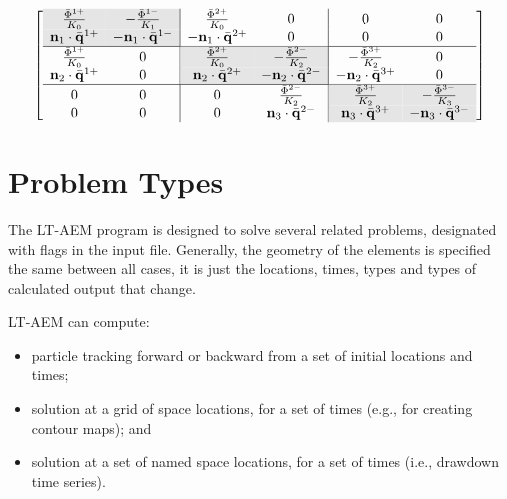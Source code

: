 \documentclass[12pt,letterpaper]{article}
\begin{document}
   \begin{equation}
  \label{eq:fullmatrix}
  \left[ \begin{array}{cc|cc|cc}
      \cellcolor[gray]{0.9}\frac{\bar{\Phi}^{1+}}{K_0} & 
      \cellcolor[gray]{0.9}-\frac{\bar{\Phi}^{1-}}{K_1}  
      & \frac{\bar{\Phi}^{2+}}{K_0}  &0&0&0\\
      \cellcolor[gray]{0.9} \mathbf{n}_1 \cdot \bar{\mathbf{q}}^{1+} & 
      \cellcolor[gray]{0.9} -\mathbf{n}_1 \cdot \bar{\mathbf{q}}^{1-} 
      & - \mathbf{n}_1 \cdot \bar{\mathbf{q}}^{2+} &0&0&0\\
      \hline
      \frac{\bar{\Phi}^{1+}}{K_0}  &0& \cellcolor[gray]{0.9} \frac{\bar{\Phi}^{2+}}{K_0} 
      & \cellcolor[gray]{0.9}-\frac{\bar{\Phi}^{2-}}{K_2}  & 
      -\frac{\bar{\Phi}^{3+}}{K_2}  & 0 \\
       \mathbf{n}_2 \cdot \bar{\mathbf{q}}^{1+}  & 0 & 
       \cellcolor[gray]{0.9} \mathbf{n}_2 \cdot \bar{\mathbf{q}}^{2+}
      & \cellcolor[gray]{0.9} -\mathbf{n}_2 \cdot \bar{\mathbf{q}}^{2-} &
      - \mathbf{n}_2 \cdot \bar{\mathbf{q}}^{3+} & 0 \\
      \hline
      0&0&0& \frac{\bar{\Phi}^{2-}}{K_2} & \cellcolor[gray]{0.9}\frac{\bar{\Phi}^{3+}}{K_2} 
      & \cellcolor[gray]{0.9}-\frac{\bar{\Phi}^{3-}}{K_3} \\
      0&0&0& \mathbf{n}_3 \cdot \bar{\mathbf{q}}^{2-} & 
      \cellcolor[gray]{0.9} \mathbf{n}_3 \cdot \bar{\mathbf{q}}^{3+} &
      \cellcolor[gray]{0.9}-\mathbf{n}_3 \cdot \bar{\mathbf{q}}^{3-}
    \end{array} \right] 
\end{equation}


\section{Problem Types}
\label{sec:problem-types}
The LT-AEM program is designed to solve several related problems,
designated with flags in the input file.  Generally, the geometry of
the elements is specified the same between all cases, it is just the
locations, times, types and types of calculated output that change.

LT-AEM can compute:
\begin{itemize}
\item particle tracking forward or backward from a set of initial
  locations and times;
\item solution at a grid of space locations, for a set of times (e.g.,
  for creating contour maps); and
\item solution at a set of named space locations, for a set of times
  (i.e., drawdown time series).
\end{itemize}
\end{document}
